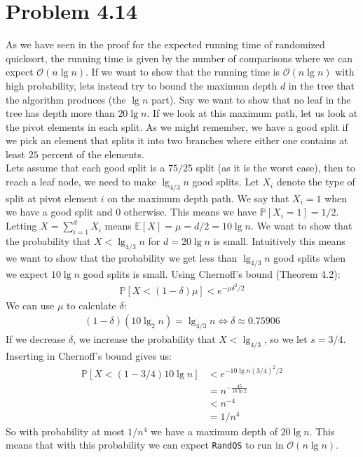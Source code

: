 \documentclass[a4paper]{article}
\begin{document}
\section*{Problem 4.14}
As we have seen in the proof for the expected running time of randomized quicksort, the running time is given by the number of comparisons where we can expect $\mathcal{O}(n\lg n)$. If we want to show that the running time is $\mathcal{O}(n\lg n)$ with high probability, lets instead try to bound the maximum depth $d$ in the tree that the algorithm produces (the $\lg n$ part). Say we want to show that no leaf in the tree has depth more than $20\lg n$. If we look at this maximum path, let us look at the pivot elements in each split. As we might remember, we have a good split if we pick an element that splits it into two branches where either one contains at least $25$ percent of the elements. \\
Lets assume that each good split is a $75/25$ split (as it is the worst case), then to reach a leaf node, we need to make $\lg_{4/3} n$ good splits. Let $X_i$ denote the type of split at pivot element $i$ on the maximum depth path. We say that $X_i=1$ when we have a good split and $0$ otherwise. This means we have $\mathbb{P}[X_i=1]=1/2$. Letting $X=\sum_{i=1}^d X_i$ means $\mathbb{E}[X]=\mu=d/2=10\lg n$. We want to show that the probability that $X < \lg_{4/3} n$ for $d=20\lg n$ is small. Intuitively this means we want to show that the probability we get less than $\lg_{4/3} n$ good splits when we expect $10\lg n$ good splits is small. Using Chernoff's bound (Theorem 4.2):
\begin{align*}
  \mathbb{P}\left[ X < (1-\delta)\mu\right] < e^{-\mu\delta^2/2}
\end{align*}
We can use $\mu$ to calculate $\delta$:
\begin{align*}
  (1-\delta)(10\lg_2 n)=\lg_{4/3} n \Leftrightarrow \delta\approx 0.75906
\end{align*}
If we decrease $\delta$, we increase the probability that $X< \lg_{4/3}$, so we let $s=3/4$. Inserting in Chernoff's bound gives us:
\begin{align*}
  \mathbb{P}\left[ X < (1-3/4)10\lg n\right] &< e^{-10\lg n(3/4)^2/2} \\
                                             &= n^{-\frac{45}{16\ln 2}} \\
                                             &< n^{-4} \\
                                             &= 1/n^4
\end{align*}
So with probability at most $1/n^4$ we have a maximum depth of $20\lg n$. This means that with this probability we can expect \texttt{RandQS} to run in $\mathcal{O}(n\lg n)$.
\end{document}
